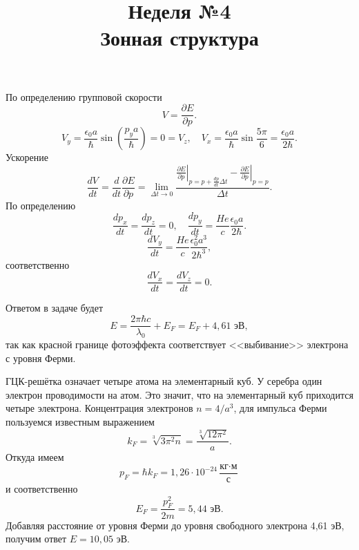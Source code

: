 \documentclass[a4paper]{article}
\title{Неделя №4\\
Зонная структура}
\begin{document}
	\maketitle
\begin{hiProb}[3.38]
\end{hiProb}
\begin{sol}
По определению групповой скорости
\[
V=\frac{\partial E}{\partial p} 
.\] 
\[
	V_y= \frac{\epsilon_0 a}{\hbar } \sin \left( \frac{p_y a}{\hbar } \right) =0=V_z,\quad
	V_x= \frac{\epsilon_0 a}{\hbar }\sin
	\frac{5\pi}{6}= \frac{\epsilon_0 a}{2\hbar }
.\] 
Ускорение
\[
\frac{dV}{dt}= \frac{d}{dt} \frac{\partial E}{\partial p} =
\lim_{\Delta t \to 0} \frac{\left. \frac{\partial E}{\partial p}  \right|_{p=p+ \frac{dp}{dt}\Delta t}-
	\left. \frac{\partial E}{\partial p}  \right|_{p=p}}{\Delta t}
.\] 
По определению
\[
\frac{dp_x}{dt}= \frac{dp_z}{dt}=0,\quad
\frac{dp_y}{dt}= \frac{He}{c} \frac{\epsilon_0 a}{
2\hbar }
.\] 
\[
\frac{dV_y}{dt}=\frac{He}{c} \frac{\epsilon_0^2 a^3}{2\hbar ^3}
,\]
соответственно
\[
\frac{dV_x}{dt}= \frac{dV_z}{dt}=0
.\] 
\end{sol}
\begin{hiProb}[3.85]
\end{hiProb}
\begin{sol}
Ответом в задаче будет
\[
E= \frac{2\pi \hbar  c}{\lambda_0}+E_F=E_F+4,61 \text{ эВ}
,\] 
так как красной границе фотоэффекта соответствует
<<выбивание>> электрона с уровня Ферми.

ГЦК-решётка означает четыре атома на элементарный
куб. У серебра один электрон проводимости на атом.
Это значит, что на элементарный куб приходится
четыре электрона. Концентрация электронов $n=4 /a^3$,
для импульса Ферми пользуемся известным выражением
\[
	k_F= \sqrt[3]{3\pi^2 n} = \frac{\sqrt[3]{12 \pi^2} }{a}
.\]
Откуда имеем
\[
p_F= \hbar  k_F=1,26 \cdot  10^{-24} \frac{\text{кг}\cdot \text{м}}{\text{с}}
\]
и соответственно
\[
E_F= \frac{p_F^2}{2m}=5,44 \text{ эВ}
.\] 
Добавляя расстояние от уровня Ферми до уровня свободного электрона 4,61 эВ, получим ответ $E=10,05$ эВ.
\end{sol}
\begin{hiProb}[3.57]
\end{hiProb}
\end{document}
